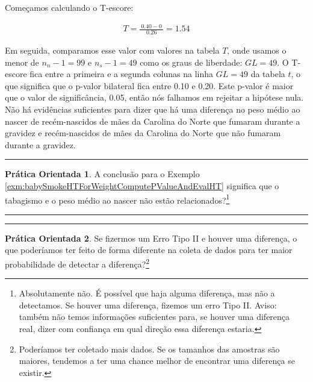 \documentclass[
]{book}
\theoremstyle{definition}
\theoremstyle{definition}
\theoremstyle{definition}
\newtheorem{exercise}{Prática Orientada}[chapter]
\theoremstyle{definition}
\theoremstyle{remark}
\begin{document}
Começamos calculando o T-escore:

\begin{eqnarray*}
T = \frac{\ 0.40 - 0\ }{0.26} = 1.54
\end{eqnarray*}

Em seguida, comparamos esse valor com valores na tabela \(T\), onde usamos o menor de \(n_n-1 = 99\) e \(n_s - 1 = 49\) como os graus de liberdade: \(GL = 49\). O T-escore fica entre a primeira e a segunda colunas na linha \(GL = 49\) da tabela \(t\), o que significa que o p-valor bilateral fica entre 0.10 e 0.20. Este p-valor é maior que o valor de significância, 0.05, então nós falhamos em rejeitar a hipótese nula. Não há evidências suficientes para dizer que há uma diferença no peso médio ao nascer de recém-nascidos de mães da Carolina do Norte que fumaram durante a gravidez e recém-nascidos de mães da Carolina do Norte que não fumaram durante a gravidez.

\begin{center}\rule{0.5\linewidth}{0.5pt}\end{center}

\begin{exercise}
\protect\hypertarget{exr:unnamed-chunk-204}{}{\label{exr:unnamed-chunk-204} }A conclusão para o Exemplo \ref{exm:babySmokeHTForWeightComputePValueAndEvalHT} significa que o tabagismo e o peso médio ao nascer não estão relacionados?\footnote{Absolutamente não. É possível que haja alguma diferença, mas não a detectamos. Se houver uma diferença, fizemos um erro Tipo II. Aviso: também não temos informações suficientes para, se houver uma diferença real, dizer com confiança em qual direção essa diferença estaria.}
\end{exercise}

\begin{center}\rule{0.5\linewidth}{0.5pt}\end{center}

\begin{center}\rule{0.5\linewidth}{0.5pt}\end{center}

\begin{exercise}
\protect\hypertarget{exr:babySmokeHTIDingHowToDetectDifferences}{}{\label{exr:babySmokeHTIDingHowToDetectDifferences} }Se fizermos um Erro Tipo II e houver uma diferença, o que poderíamos ter feito de forma diferente na coleta de dados para ter maior probabilidade de detectar a diferença?\footnote{Poderíamos ter coletado mais dados. Se os tamanhos das amostras são maiores, tendemos a ter uma chance melhor de encontrar uma diferença se existir.}
\end{exercise}
\end{document}
